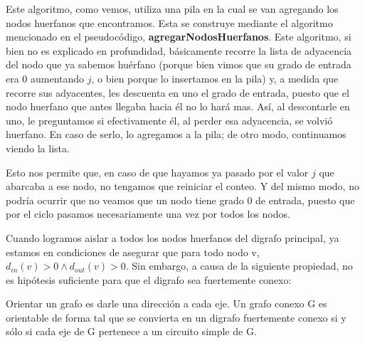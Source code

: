 \par
Este algoritmo, como vemos, utiliza una pila en la cual se van agregando los nodos huerfanos que encontramos. Esta se construye mediante el algoritmo mencionado en el pseudocódigo, \textbf{agregarNodosHuerfanos}. Este algoritmo, si bien no es explicado en profundidad, básicamente recorre la lista de adyacencia del nodo que ya sabemos huérfano (porque bien vimos que su grado de entrada era 0 aumentando $j$, o bien porque lo insertamos en la pila) y, a medida que recorre sus adyacentes, les descuenta en uno el grado de entrada, puesto que el nodo huerfano que antes llegaba hacia él no lo hará mas. Así, al descontarle en uno, le preguntamos si efectivamente él, al perder esa adyacencia, se volvió huerfano. En caso de serlo, lo agregamos a la pila; de otro modo, continuamos viendo la lista.
\\
\par
Esto nos permite que, en caso de que hayamos ya pasado por el valor $j$ que abarcaba a ese nodo, no tengamos que reiniciar el conteo. Y del mismo modo, no podría ocurrir que no veamos que un nodo tiene grado 0 de entrada, puesto que por el ciclo pasamos necesariamente una vez por todos los nodos.
\\
\par
Cuando logramos aislar a todos los nodos huerfanos del digrafo principal, ya estamos en condiciones de asegurar que para todo nodo v, $d_{in} (v) > 0 \land d_{out} (v) > 0$. Sin embargo, a causa de la siguiente propiedad, no es hipótesis suficiente para que el digrafo sea fuertemente conexo:
\\
\par
\begin{center}
Orientar un grafo es darle una dirección a cada eje. Un grafo conexo G es orientable de forma tal que se convierta en un digrafo fuertemente conexo si y sólo si cada eje de G pertenece a un circuito simple de G.
\end{center}

